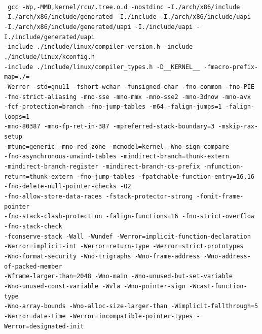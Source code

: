 \documentclass[10]{article}
\begin{document}
~\\
{
	\scriptsize
	\texttt{
	gcc -Wp,-MMD,kernel/rcu/.tree.o.d -nostdinc
	-I./arch/x86/include \\
	-I./arch/x86/include/generated  -I./include
	-I./arch/x86/include/uapi \\
	-I./arch/x86/include/generated/uapi
	-I./include/uapi -I./include/generated/uapi \\
	-include ./include/linux/compiler-version.h
	-include ./include/linux/kconfig.h \\
	-include ./include/linux/compiler\_types.h -D\_\_KERNEL\_\_
	-fmacro-prefix-map=./= \\
	-Werror -std=gnu11 -fshort-wchar
	-funsigned-char -fno-common -fno-PIE \\
	-fno-strict-aliasing -mno-sse
	-mno-mmx -mno-sse2 -mno-3dnow -mno-avx \\
	-fcf-protection=branch
	-fno-jump-tables -m64 -falign-jumps=1 -falign-loops=1 \\
	-mno-80387 -mno-fp-ret-in-387 -mpreferred-stack-boundary=3
	-mskip-rax-setup \\
	-mtune=generic -mno-red-zone -mcmodel=kernel
	-Wno-sign-compare \\
	-fno-asynchronous-unwind-tables
	-mindirect-branch=thunk-extern \\
	-mindirect-branch-register
	-mindirect-branch-cs-prefix -mfunction-return=thunk-extern
	-fno-jump-tables -fpatchable-function-entry=16,16
	-fno-delete-null-pointer-checks -O2 \\
	-fno-allow-store-data-races
	-fstack-protector-strong -fomit-frame-pointer \\
	-fno-stack-clash-protection -falign-functions=16
	-fno-strict-overflow -fno-stack-check \\
	-fconserve-stack
	-Wall -Wundef -Werror=implicit-function-declaration \\
	-Werror=implicit-int -Werror=return-type -Werror=strict-prototypes \\
	-Wno-format-security -Wno-trigraphs -Wno-frame-address
	-Wno-address-of-packed-member \\
	-Wframe-larger-than=2048 -Wno-main
	-Wno-unused-but-set-variable \\
	-Wno-unused-const-variable -Wvla
	-Wno-pointer-sign -Wcast-function-type \\
	-Wno-array-bounds
	-Wno-alloc-size-larger-than -Wimplicit-fallthrough=5 \\
	-Werror=date-time -Werror=incompatible-pointer-types
	-Werror=designated-init \\
}}
\end{document}
